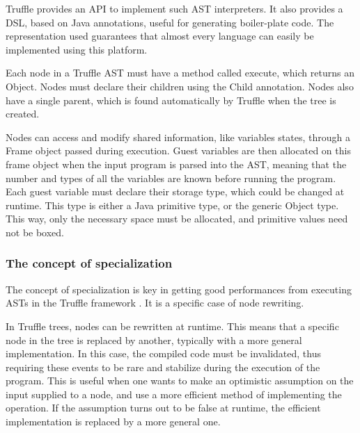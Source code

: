\documentclass[twoside,11pt,a4paper]{article}
\newcommand{\java}[1]{\textsf{#1}}
\begin{document}
Truffle provides an API to implement such AST interpreters. It also provides a DSL, based on Java annotations, useful for generating boiler-plate code. The representation used guarantees that almost every language can easily be implemented using this platform.

Each node in a Truffle AST must have a method called \java{execute}, which returns an \java{Object}. Nodes must declare their children using the \java{Child} annotation. Nodes also have a single parent, which is found automatically by Truffle when the tree is created.

Nodes can access and modify shared information, like variables states, through a \java{Frame} object passed during execution. Guest variables are then allocated on this frame object when the input program is parsed into the AST, meaning that the number and types of all the variables are known before running the program. Each guest variable must declare their storage type, which could be changed at runtime. This type is either a Java primitive type, or the generic \java{Object} type. This way, only the necessary space must be allocated, and primitive values need not be boxed.


\subsubsection{The concept of specialization}

The concept of specialization is key in getting good performances from executing ASTs in the Truffle framework \cite{trufflespec, truffledsl}. It is a specific case of node rewriting.

In Truffle trees, nodes can be rewritten at runtime. This means that a specific node in the tree is replaced by another, typically with a more general implementation. In this case, the compiled code must be invalidated, thus requiring these events to be rare and stabilize during the execution of the program. This is useful when one wants to make an optimistic assumption on the input supplied to a node, and use a more efficient method of implementing the operation. If the assumption turns out to be false at runtime, the efficient implementation is replaced by a more general one.
\end{document}
